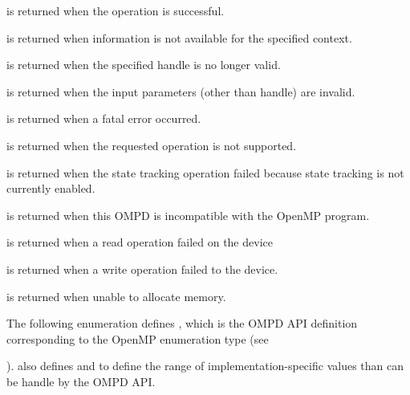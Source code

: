 \descr
\label{ompd:ompd_rc_ok}
 is returned when the operation is successful.

\label{ompd:ompd_rc_unavailable}
 is returned when 
information is not available for the specified context.

\label{ompd:ompd_rc_stale_handle}
 is returned when
the specified handle is no longer valid.

\label{ompd:ompd_rc_bad_input}
 is returned when
the input parameters (other than handle) are invalid. 

\label{ompd:ompd_rc_error}
 is returned when
a fatal error occurred.

\label{ompd:ompd_rc_unsupported}
 is returned when
the requested operation is not supported.

\label{ompd:ompd_rc_needs_state_tracking}
 is returned when
the state tracking operation failed because state tracking is not currently enabled.

\label{ompd:ompd_rc_incompatible}
 is returned when
this OMPD is incompatible with the OpenMP program.

\label{ompd:ompd_rc_device_read_error}
 is returned when
a read operation failed on the device

\label{ompd:ompd_rc_device_write_error}
 is returned when
a write operation failed to the device.

\label{ompd:ompd_rc_nomem}
 is returned when
unable to allocate memory.

\label{ompd:ompd_sched_t}

The following enumeration defines , which is the OMPD API definition 
corresponding to the OpenMP enumeration type  (see 

).
 also defines  and
 to define the range of implementation-specific 
 values than can be handle by the OMPD API.

\begin{quote}
	\begin{lstlisting}

	\end{lstlisting}
\end{quote}

